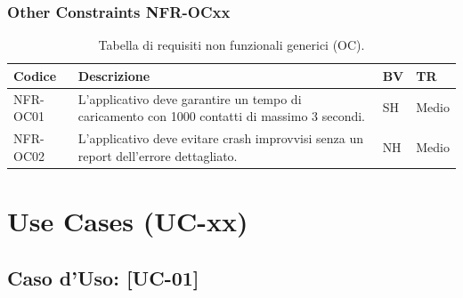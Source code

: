 \documentclass[a4paper,12pt]{article}
\begin{document}
    \subsubsection{Other Constraints NFR-OCxx}
    \begin{table}[H]
        \centering
        \begin{tabular}{|l|p{8cm}|l|l|}
            \hline
            \textbf{Codice} & \textbf{Descrizione} & \textbf{BV} & \textbf{TR} \\
            \hline
            NFR-OC01 & L'applicativo deve garantire un tempo di caricamento con 1000 contatti di massimo 3 secondi. & SH & Medio \\
            \hline
            NFR-OC02 & L'applicativo deve evitare crash improvvisi senza un report dell'errore dettagliato. & NH & Medio \\
            \hline
        \end{tabular}
        \caption{Tabella di requisiti non funzionali generici (OC).}
    \end{table}
    \section{Use Cases (UC-xx)}
    \subsection{Caso d'Uso: [UC-01]}
\end{document}
